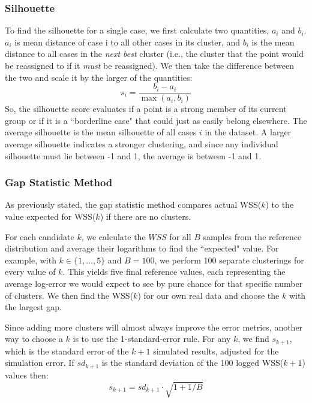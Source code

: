 \begin{enumerate}
\end{enumerate}

\subsubsection{Silhouette}

To find the silhouette for a single case, we first calculate two quantities, $a_i$ and $b_i$. $a_i$ is mean distance of case i to all other cases in its cluster, and $b_i$ is the mean distance to all cases in the \textit{next best} cluster (i.e., the cluster that the point would be reassigned to if it \textit{must} be reassigned). We then take the difference between the two and scale it by the larger of the quantities:
\[
s_i = \frac{b_i - a_i}{\max(a_i, b_i)}
\]
So, the silhouette score evaluates if a point is a strong member of its current group or if it is a ``borderline case" that could just as easily belong elsewhere. The average silhouette is the mean silhouette of all cases $i$ in the dataset. A larger average silhouette indicates a stronger clustering, and since any individual silhouette must lie between -1 and 1, the average is between -1 and 1. 

\bigskip

\subsubsection{Gap Statistic Method}

\medskip

As previously stated, the gap statistic method compares actual WSS($k$) to the value expected for WSS($k$) if there are no clusters. 

For each candidate $k$, we calculate the $WSS$ for all $B$ samples from the reference distribution and average their logarithms to find the ``expected" value. For example, with $k \in \{1, \dots, 5\}$ and $B=100$, we perform 100 separate clusterings for every value of $k$. This yields five final reference values, each representing the average log-error we would expect to see by pure chance for that specific number of clusters. We then find the WSS($k$) for our own real data and choose the $k$ with the largest gap.

Since adding more clusters will almost always improve the error metrics, another way to choose a $k$ is to use the 1-standard-error rule. For any $k$, we find $s_{k+1}$, which is the standard error of the $k+1$ simulated results, adjusted for the simulation error. If $sd_{k+1}$ is the standard deviation of the 100 logged WSS($k+1$) values then:
\[
s_{k+1} = sd_{k+1}\cdot\sqrt{1+1/B}
\]

